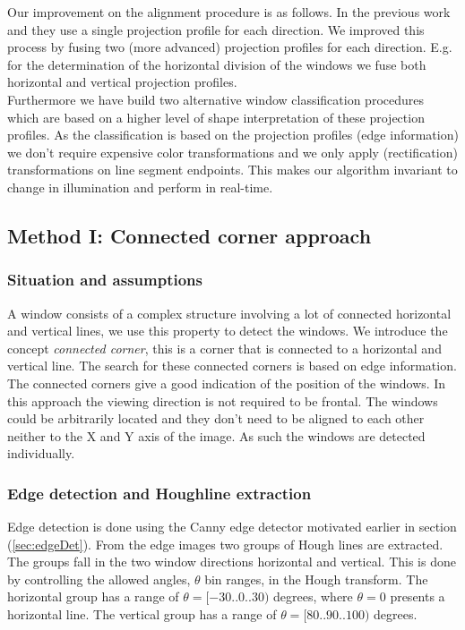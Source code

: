 Our improvement on the alignment procedure is as follows.
In the previous work \cite{Recky_kmeans} and \cite{Lee_extraction} they use
a single projection profile for each direction.  We improved this 
process by fusing two (more advanced) projection profiles for each direction.
E.g. for the determination of the horizontal division of the windows we fuse both
horizontal and vertical projection profiles.\\

Furthermore we have build two alternative window classification procedures which are 
based on a higher level of shape interpretation of these projection profiles.
As the classification is based on the projection profiles (edge information) we
don't require expensive color transformations and we only apply (rectification)
transformations on line segment endpoints. This makes our algorithm invariant to
change in illumination and perform in real-time.  
	










\subsection{Method I: Connected corner approach} 
\subsubsection{Situation and assumptions}
A window consists of a complex structure involving a lot of connected horizontal
and vertical lines, we use this property to detect the windows. 
We introduce the concept \emph{connected corner}, this is a corner that is 
connected to a horizontal and vertical line.  
The search for these connected corners is based on edge information.
The connected corners give a good indication of the position of the windows. 
In this approach the viewing direction is not required to be frontal.
The windows could be arbitrarily located and they don't need
to be aligned to each other neither to the X and Y axis of the image.
As such the windows are detected individually.

\subsubsection{Edge detection and Houghline extraction}
Edge detection is done using the Canny edge detector motivated earlier in
section (\ref{sec:edgeDet}).
From the edge images two groups of Hough lines are extracted. 
The groups fall in the two window directions horizontal and vertical.
This is done by controlling the allowed angles, $\theta$ bin ranges, in the Hough transform.
The horizontal group has a range of $\theta = [-30..0..30)$ degrees, where $\theta = 0$ presents a horizontal line. 
The vertical group has a range of $\theta = [80..90..100)$ degrees. 

